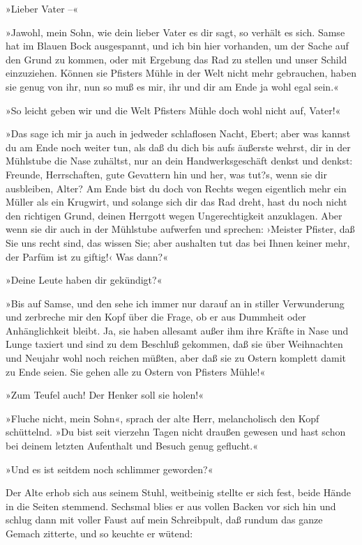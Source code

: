 »Lieber Vater –«

»Jawohl, mein Sohn, wie dein lieber Vater es dir sagt, so verhält
es sich. Samse hat im Blauen Bock ausgespannt, und ich bin hier
vorhanden, um der Sache auf den Grund zu kommen, oder mit Ergebung
das Rad zu stellen und unser Schild einzuziehen. Können sie
Pfisters Mühle in der Welt nicht mehr gebrauchen, haben sie genug
von ihr, nun so muß es mir, ihr und dir am Ende ja wohl egal
sein.«

»So leicht geben wir und die Welt Pfisters Mühle doch wohl nicht
auf, Vater!«

»Das sage ich mir ja auch in jedweder schlaflosen Nacht, Ebert;
aber was kannst du am Ende noch weiter tun, als daß du dich bis
aufs äußerste wehrst, dir in der Mühlstube die Nase zuhältst, nur
an dein Handwerksgeschäft denkst und denkst: Freunde, Herrschaften,
gute Gevattern hin und her, was tut?s, wenn sie dir ausbleiben,
Alter? Am Ende bist du doch von Rechts wegen eigentlich mehr ein
Müller als ein Krugwirt, und solange sich dir das Rad dreht, hast
du noch nicht den richtigen Grund, deinen Herrgott wegen
Ungerechtigkeit anzuklagen. Aber wenn sie dir auch in der Mühlstube
aufwerfen und sprechen: ›Meister Pfister, daß Sie uns recht sind,
das wissen Sie; aber aushalten tut das bei Ihnen keiner mehr, der
Parfüm ist zu giftig!‹ Was dann?«

»Deine Leute haben dir gekündigt?«

»Bis auf Samse, und den sehe ich immer nur darauf an in stiller
Verwunderung und zerbreche mir den Kopf über die Frage, ob er aus
Dummheit oder Anhänglichkeit bleibt. Ja, sie haben allesamt außer
ihm ihre Kräfte in Nase und Lunge taxiert und sind zu dem Beschluß
gekommen, daß sie über Weihnachten und Neujahr wohl noch reichen
müßten, aber daß sie zu Ostern komplett damit zu Ende seien. Sie
gehen alle zu Ostern von Pfisters Mühle!«

»Zum Teufel auch! Der Henker soll sie holen!«

»Fluche nicht, mein Sohn«, sprach der alte Herr, melancholisch den
Kopf schüttelnd. »Du bist seit vierzehn Tagen nicht draußen gewesen
und hast schon bei deinem letzten Aufenthalt und Besuch genug
geflucht.«

»Und es ist seitdem noch schlimmer geworden?«

Der Alte erhob sich aus seinem Stuhl, weitbeinig stellte er sich
fest, beide Hände in die Seiten stemmend. Sechsmal blies er aus
vollen Backen vor sich hin und schlug dann mit voller Faust auf
mein Schreibpult, daß rundum das ganze Gemach zitterte, und so
keuchte er wütend:

